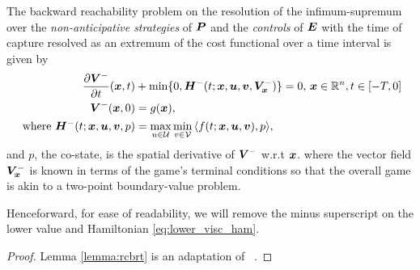 \begin{lemma}
	The backward reachability problem on the resolution of the infimum-supremum over the \textit{non-anticipative strategies} of $\bm{P}$ and the \textit{controls} of $\bm{E}$ with the time of capture resolved as an extremum of the cost functional over a time interval is given by %
	\begin{subequations}
		\begin{align}
			\frac{\partial \bm{V}^-}{\partial t}{(\bm{x}, t)} & + \min \{0, \bm{H}^- (t; \bm{x}, \bm{u}, \bm{v},\bm{V}^-_{\bm{x}}) \} = 0, \, \bm{x} \in \mathbb{R}^n, t \in \left[-T, 0\right]\\
			\bm{V}^-(\bm{x},0) &= g(\bm{x}), \\
	\text{ where } 	\bm{H}^- (t; \bm{x}, \bm{u}, \bm{v}, p) &= \max_{u \in \mathcal{U}} \min_{v \in \mathcal{V}} \, \langle f(t; \bm{x}, \bm{u}, \bm{v}), p  \rangle,
		\label{eq:lower_visc_ham}
	\end{align}
	\label{eq:lower_hji_pde}
	\end{subequations}
	and $p$, the co-state, is the spatial derivative of $\bm{V}^-$ w.r.t $\bm{x}$.
	\noindent where the vector field $\bm{V}^-_{\bm{x}}$ is known in terms of the game's terminal conditions so that the overall game is akin to a two-point boundary-value problem.
	\label{lemma:rcbrt}
\end{lemma} 
%
\noindent Henceforward, for ease of readability, we will remove the minus superscript on the lower value and Hamiltonian \eqref{eq:lower_visc_ham}. 
%
\begin{proof}
	Lemma \ref{lemma:rcbrt} is an adaptation of ~\cite{Mitchell2005}.
\end{proof}

%

